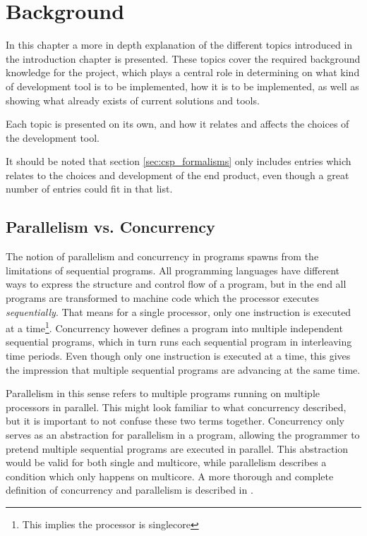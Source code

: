 
\chapter{Background}

In this chapter a more in depth explanation of the different topics introduced in the introduction chapter is presented. These topics cover the required background knowledge for the project, which plays a central role in determining on what kind of development tool is to be implemented, how it is to be implemented, as well as showing what already exists of current solutions and tools.

Each topic is presented on its own, and how it relates and affects the choices of the development tool.

It should be noted that section \ref{sec:csp_formalisms} only includes entries which relates to the choices and development of the end product, even though a great number of entries could fit in that list.

\section{Parallelism vs. Concurrency}

The notion of parallelism and concurrency in programs spawns from the limitations of sequential programs. All programming languages have different ways to express the structure and control flow of a program, but in the end all programs are transformed to machine code which the processor executes \textit{sequentially}. That means for a single processor, only one instruction is executed at a time\footnote{This implies the processor is singlecore}. Concurrency however defines a program into multiple independent sequential programs, which in turn runs each sequential program in interleaving time periods. Even though only one instruction is executed at a time, this gives the impression that multiple sequential programs are advancing at the same time.

Parallelism in this sense refers to multiple programs running on multiple processors in parallel. This might look familiar to what concurrency described, but it is important to not confuse these two terms together. Concurrency only serves as an abstraction for parallelism in a program, allowing the programmer to pretend multiple sequential programs are executed in parallel. This abstraction would be valid for both single and multicore, while parallelism describes a condition which only happens on multicore. A more thorough and complete definition of concurrency and parallelism is described in \citet{benari2006}.

